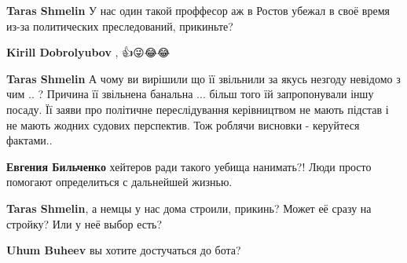 \begin{itemize}
\begin{itemize}
 
\textbf{Taras Shmelin} У нас один такой проффесор аж в Ростов убежал в своё время из-за политических преследований, прикиньте?

 
\textbf{Kirill Dobrolyubov} , 👍😜😂😂

 
\textbf{Taras Shmelin} А чому ви вирішили що її звільнили за якусь незгоду невідомо з чим .. ?
Причина її звільнена банальна ... більш того їй запропонували іншу посаду.
Її заяви про політичне переслідування керівництвом не мають підстав і не мають жодних судових перспектив.
Тож роблячи висновки - керуйтеся фактами.. \Smiley[1.0][yellow]

 
\textbf{Евгения Бильченко} хейтеров ради такого уебища нанимать?! Люди просто помогают определиться с дальнейшей жизнью. \Laughey[1.0][white]

 
\textbf{Taras Shmelin}, а немцы у нас дома строили, прикинь? Может её сразу на стройку? Или у неё выбор есть?

 
\textbf{Uhum Buheev} вы хотите достучаться до бота?


\end{itemize}
\end{itemize}
